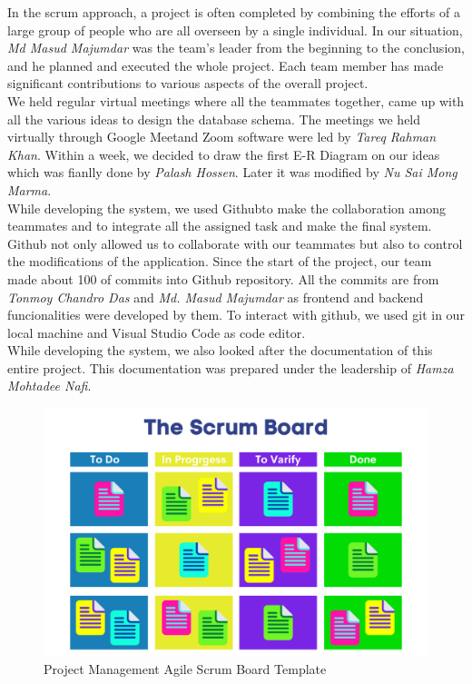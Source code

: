 \begin{enumerate}
In the scrum approach, a project is often completed by combining the efforts of a large group of people who are all overseen by a single individual. In our situation, \textit{Md Masud Majumdar} was the team's leader from the beginning to the conclusion, and he planned and executed the whole project. Each team member has made significant contributions to various aspects of the overall project.\\

We held regular virtual meetings where all the teammates together, came up with all the various ideas to design the database schema. The meetings we held virtually through Google Meet\footnotemark and Zoom software were led by \textit{Tareq Rahman Khan}. Within a week, we decided to draw the first E-R Diagram on our ideas which was fianlly done by \textit{Palash Hossen}. Later it was modified by \textit{Nu Sai Mong Marma}.\\

While developing the system, we used Github\footnotemark to make the collaboration among teammates and to integrate all the assigned task and make the final system. Github not only allowed us to collaborate with our teammates but also to control the modifications of the application. Since the start of the project, our team made about 100 of commits into Github repository. All the commits are from \textit{Tonmoy Chandro Das} and \textit{Md. Masud Majumdar} as frontend and backend funcionalities were developed by them. To interact with github, we used git in our local machine and Visual Studio Code as code editor.\\

While developing the system, we also looked after the documentation of this entire project. This documentation was prepared under the leadership of \textit{Hamza Mohtadee Nafi}.\\

\begin{figure}[H]
    \centering
    \includegraphics[width=1\textwidth]{images/scrum_board}
    \caption{Project Management Agile Scrum Board Template}
    \label{fig:scrum_board}
\end{figure}


\end{enumerate}
